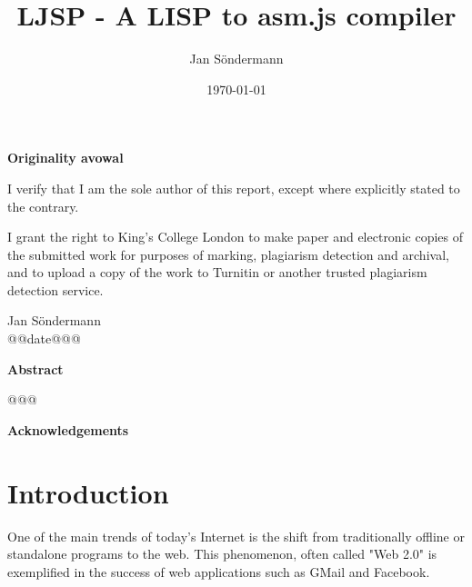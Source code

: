 \documentclass[11pt]{report}
\title{LJSP - A LISP to asm.js compiler}
\author{Jan S\"ondermann}
\date{\today}
\begin{document}


\maketitle


\begin{center}
\textbf{Originality avowal}
\end{center}

I verify that I am the sole author of this report, except where explicitly stated to the contrary.

I grant the right to King's College London to make paper and electronic copies of the submitted work for purposes of marking, plagiarism detection and archival, and to upload a copy of the work to Turnitin or another trusted plagiarism detection service.

\begin{flushright}
Jan Söndermann \\
@@date@@@
\end{flushright}
\newpage
			
\begin{center}
\textbf{Abstract}
\end{center}

@@@
\newpage

\begin{center}
\textbf{Acknowledgements}
\end{center}
\newpage

\tableofcontents
\newpage

\chapter{Introduction}
One of the main trends of today's Internet is the shift from traditionally offline or standalone programs to the web. This phenomenon, often called "Web 2.0" is exemplified in the success of web applications such as GMail and Facebook.
\end{document}
